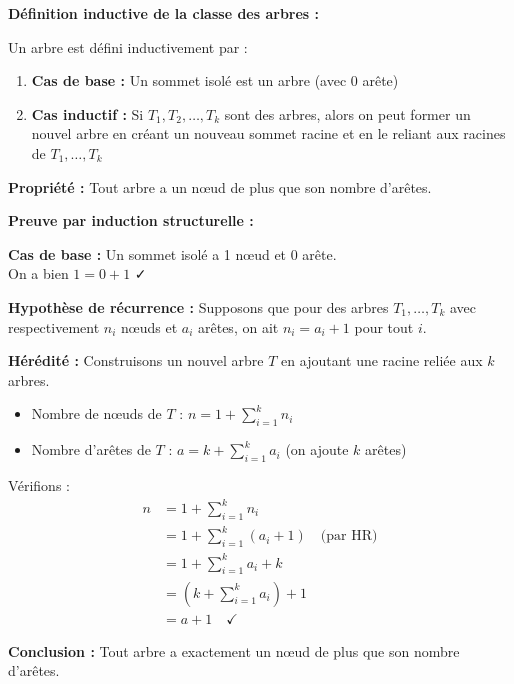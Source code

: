 \documentclass[12pt,a4paper]{article}
\begin{document}
\begin{correction}
\textbf{Définition inductive de la classe des arbres :}

Un arbre est défini inductivement par :
\begin{enumerate}
    \item \textbf{Cas de base :} Un sommet isolé est un arbre (avec 0 arête)
    \item \textbf{Cas inductif :} Si $T_1, T_2, \ldots, T_k$ sont des arbres, alors on peut former un nouvel arbre en créant un nouveau sommet racine et en le reliant aux racines de $T_1, \ldots, T_k$
\end{enumerate}
\end{correction}

\begin{demonstration}
\textbf{Propriété :} Tout arbre a un nœud de plus que son nombre d'arêtes.

\textbf{Preuve par induction structurelle :}

\textbf{Cas de base :} Un sommet isolé a 1 nœud et 0 arête. \\
On a bien $1 = 0 + 1$ ✓

\textbf{Hypothèse de récurrence :} Supposons que pour des arbres $T_1, \ldots, T_k$ avec respectivement $n_i$ nœuds et $a_i$ arêtes, on ait $n_i = a_i + 1$ pour tout $i$.

\textbf{Hérédité :} Construisons un nouvel arbre $T$ en ajoutant une racine reliée aux $k$ arbres.

\begin{itemize}
    \item Nombre de nœuds de $T$ : $n = 1 + \sum_{i=1}^{k} n_i$
    \item Nombre d'arêtes de $T$ : $a = k + \sum_{i=1}^{k} a_i$ (on ajoute $k$ arêtes)
\end{itemize}

Vérifions :
\begin{align*}
n &= 1 + \sum_{i=1}^{k} n_i \\
&= 1 + \sum_{i=1}^{k} (a_i + 1) \quad \text{(par HR)} \\
&= 1 + \sum_{i=1}^{k} a_i + k \\
&= \left(k + \sum_{i=1}^{k} a_i\right) + 1 \\
&= a + 1 \quad ✓
\end{align*}

\textbf{Conclusion :} Tout arbre a exactement un nœud de plus que son nombre d'arêtes.
\end{demonstration}
\end{document}
